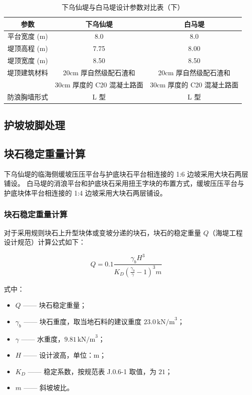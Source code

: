 \documentclass[UTF8, a4paper, 12pt]{ctexart} %
\begin{document}
\begin{table}[h]
    \centering
    \caption{下乌仙堤与白马堤设计参数对比表（下）}
    \begin{tabular}{|c|c|c|}
        \hline
        \textbf{参数} & \textbf{下乌仙堤} & \textbf{白马堤} \\ \hline
        平台宽度 (m) & 8.0 & 8.0 \\ \hline
        堤顶高程 (m) & 7.75 & 8.00 \\ \hline
        堤顶宽度 (m) & 8.50 & 8.50 \\ \hline
        堤顶建筑材料 & 20cm 厚自然级配石渣和 &20cm 厚自然级配石渣和\\ 
        & 30cm 厚度的 C20 混凝土路面 &  30cm 厚度的 C20 混凝土路面\\ \hline
        防浪胸墙形式 & L 型 & L 型 \\ \hline
    \end{tabular}
    \label{tab:west_south_dike_comparison_part2}
\end{table}



\subsection{护坡坡脚处理}
\subsection{块石稳定重量计算}

下乌仙堤的临海侧缓坡压压平台与护底块石平台相连接的 1:6 边坡采用大块石两层铺设。
白马堤的消浪平台和护底块石采用扭王字块的布置方式，缓坡压压平台与护底块体平台相连接的 1:4 边坡采用大块石两层铺设。

\subsubsection{块石稳定重量计算}

对于采用规则块石上升型块体或变坡分递的块石，块石的稳定重量 $Q$（海堤工程设计规范）计算公式如下：

\begin{equation}
Q = 0.1 \frac{\gamma_b H^3}{K_D \left( \frac{\gamma_b}{\gamma} - 1 \right)^3 m} 
\end{equation}

式中：
\begin{itemize}
    \item $Q$ —— 块石稳定重量；
    \item $\gamma_b$ —— 块石重度，取当地石料的建议重度 $23.0\,\text{kN/m}^3$；
    \item $\gamma$ —— 水重度，$9.81\,\text{kN/m}^3$；
    \item $H$ —— 设计波高，单位：$\text{m}$；
    \item $K_D$ —— 稳定系数，按规范表 J.0.6-1 取值，为 $21$；
    \item $m$ —— 斜坡坡比。
\end{itemize}
\end{document}
